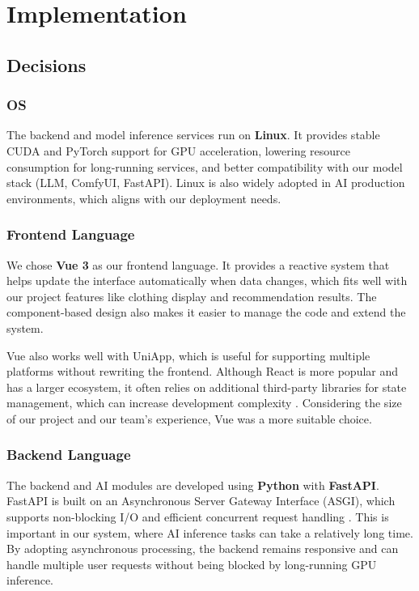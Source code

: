 \chapter{Implementation}
\label{ch:implementation}

\section{Decisions}
\subsection{OS}
The backend and model inference services run on \textbf{Linux}. It provides stable CUDA and PyTorch support for GPU acceleration, lowering resource consumption for long-running services, and better compatibility with our model stack (LLM, ComfyUI, FastAPI). Linux is also widely adopted in AI production environments, which aligns with our deployment needs.

\subsection{Frontend Language}
We chose \textbf{Vue 3} as our frontend language. It provides a reactive system that helps update the interface automatically when data changes, which fits well with our project features like clothing display and recommendation results. The component-based design also makes it easier to manage the code and extend the system.

Vue also works well with UniApp, which is useful for supporting multiple platforms without rewriting the frontend. Although React is more popular and has a larger ecosystem, it often relies on additional third-party libraries for state management, which can increase development complexity \citep{Kari2024ComparisonOJ}. Considering the size of our project and our team’s experience, Vue was a more suitable choice.


\subsection{Backend Language}
The backend and AI modules are developed using \textbf{Python} with \textbf{FastAPI}. FastAPI is built on an Asynchronous Server Gateway Interface (ASGI), which supports non-blocking I/O and efficient concurrent request handling \citep{FastAPI2018}. This is important in our system, where AI inference tasks can take a relatively long time. By adopting asynchronous processing, the backend remains responsive and can handle multiple user requests without being blocked by long-running GPU inference.

